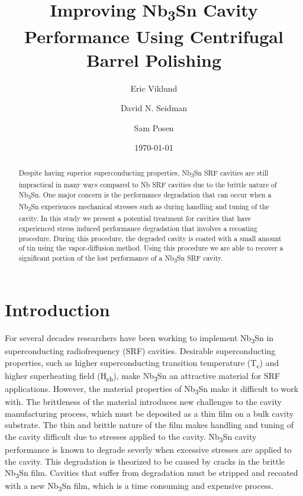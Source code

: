 \documentclass[]{revtex4-2}
\begin{document}
\title{Improving Nb\textsubscript{3}Sn Cavity Performance Using Centrifugal Barrel Polishing}
\author{Eric Viklund}
\author{David N. Seidman}
\author{Sam Posen}


\date{\today}

\begin{abstract}

    Despite having superior superconducting properties, Nb\textsubscript{3}Sn SRF cavities are still impractical in many ways compared to Nb SRF cavities due to the brittle nature of Nb\textsubscript{3}Sn. One major concern is the performance degradation that can occur when a Nb\textsubscript{3}Sn experiences mechanical stresses such as during handling and tuning of the cavity. In this study we present a potential treatment for cavities that have experienced stress induced performance degradation that involves a recoating procedure. During this procedure, the degraded cavity is coated with a small amount of tin using the vapor-diffusion method. Using this procedure we are able to recover a significant portion of the lost performance of a Nb\textsubscript{3}Sn SRF cavity.

\end{abstract}

\maketitle

\section{Introduction}
\label{sec:Introduction}

For several decades researchers have been working to implement Nb\textsubscript{3}Sn in superconducting radiofrequency (SRF) cavities. Desirable superconducting properties, such as higher superconducting transition temperature (T\textsubscript{c}) and higher superheating field (H\textsubscript{sh})\cite{liarte2017theoretical, catelani2008temperature, lin2012effect, kubo2020superfluid}, make Nb\textsubscript{3}Sn an attractive material for SRF applications. However, the material properties of Nb\textsubscript{3}Sn make it difficult to work with. The brittleness of the material introduces new challenges to the cavity manufacturing process, which must be deposited as a thin film on a bulk cavity substrate.\cite{posen2017nb3sn, pudasaini2019growth, porter2018update} The thin and brittle nature of the film makes handling and tuning of the cavity difficult due to stresses applied to the cavity. Nb\textsubscript{3}Sn cavity performance is known to degrade severly when excessive stresses are applied to the cavity. This degradation is theorized to be caused by cracks in the brittle Nb\textsubscript{3}Sn film. Cavities that suffer from degradation must be stripped and recoated with a new Nb\textsubscript{3}Sn film, which is a time consuming and expensive process.
\end{document}
